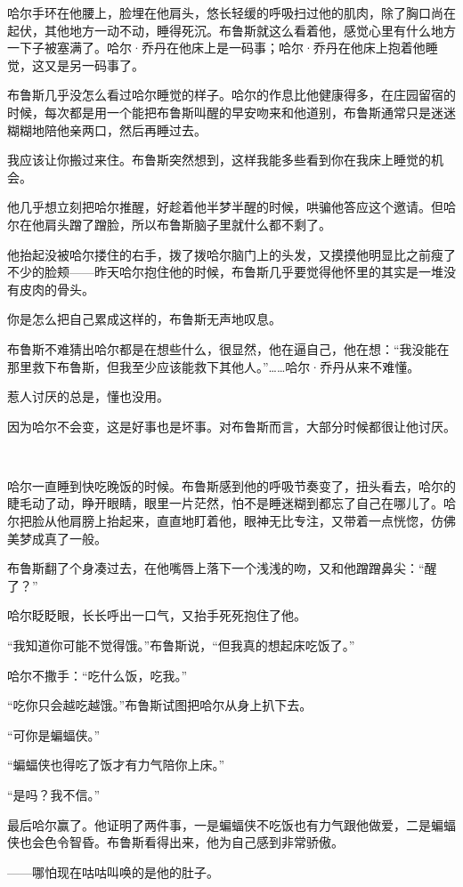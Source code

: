 \documentclass[../main]{subfiles}
\begin{document}
哈尔手环在他腰上，脸埋在他肩头，悠长轻缓的呼吸扫过他的肌肉，除了胸口尚在起伏，其他地方一动不动，睡得死沉。布鲁斯就这么看着他，感觉心里有什么地方一下子被塞满了。哈尔·乔丹在他床上是一码事；哈尔·乔丹在他床上抱着他睡觉，这又是另一码事了。

布鲁斯几乎没怎么看过哈尔睡觉的样子。哈尔的作息比他健康得多，在庄园留宿的时候，每次都是用一个能把布鲁斯叫醒的早安吻来和他道别，布鲁斯通常只是迷迷糊糊地陪他亲两口，然后再睡过去。

我应该让你搬过来住。布鲁斯突然想到，这样我能多些看到你在我床上睡觉的机会。

他几乎想立刻把哈尔推醒，好趁着他半梦半醒的时候，哄骗他答应这个邀请。但哈尔在他肩头蹭了蹭脸，所以布鲁斯脑子里就什么都不剩了。

他抬起没被哈尔搂住的右手，拨了拨哈尔脑门上的头发，又摸摸他明显比之前瘦了不少的脸颊——昨天哈尔抱住他的时候，布鲁斯几乎要觉得他怀里的其实是一堆没有皮肉的骨头。

你是怎么把自己累成这样的，布鲁斯无声地叹息。

布鲁斯不难猜出哈尔都是在想些什么，很显然，他在逼自己，他在想：“我没能在那里救下布鲁斯，但我至少应该能救下其他人。”……哈尔·乔丹从来不难懂。

惹人讨厌的总是，懂也没用。

因为哈尔不会变，这是好事也是坏事。对布鲁斯而言，大部分时候都很让他讨厌。

~\

哈尔一直睡到快吃晚饭的时候。布鲁斯感到他的呼吸节奏变了，扭头看去，哈尔的睫毛动了动，睁开眼睛，眼里一片茫然，怕不是睡迷糊到都忘了自己在哪儿了。哈尔把脸从他肩膀上抬起来，直直地盯着他，眼神无比专注，又带着一点恍惚，仿佛美梦成真了一般。

布鲁斯翻了个身凑过去，在他嘴唇上落下一个浅浅的吻，又和他蹭蹭鼻尖：“醒了？”

哈尔眨眨眼，长长呼出一口气，又抬手死死抱住了他。

“我知道你可能不觉得饿。”布鲁斯说，“但我真的想起床吃饭了。”

哈尔不撒手：“吃什么饭，吃我。”

“吃你只会越吃越饿。”布鲁斯试图把哈尔从身上扒下去。

“可你是蝙蝠侠。”

“蝙蝠侠也得吃了饭才有力气陪你上床。”

“是吗？我不信。”

最后哈尔赢了。他证明了两件事，一是蝙蝠侠不吃饭也有力气跟他做爱，二是蝙蝠侠也会色令智昏。布鲁斯看得出来，他为自己感到非常骄傲。

——哪怕现在咕咕叫唤的是他的肚子。
\end{document}
